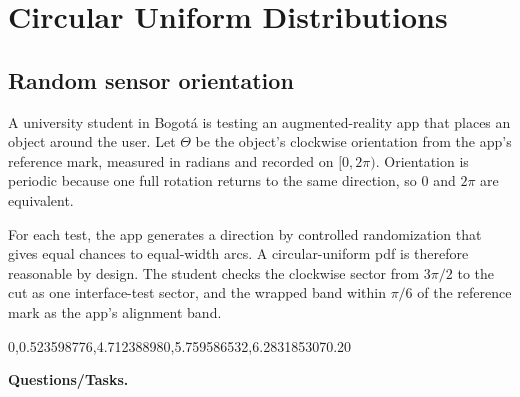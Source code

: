 \section{Circular Uniform Distributions}\label{sec:c3-uniform}
	
	\subsection{Random sensor orientation}\label{sec:c3-uniform-sensor}
	A university student in Bogot\'a is testing an augmented-reality app that places
	an object around the user.  Let $\Theta$ be the object's clockwise orientation
	from the app's reference mark, measured in radians and recorded on $[0,2\pi)$.
	Orientation is periodic because one full rotation returns to the same direction,
	so $0$ and $2\pi$ are equivalent.
	
	For each test, the app generates a direction by controlled randomization that
	gives equal chances to equal-width arcs.  A circular-uniform pdf is therefore
	reasonable by design.  The student checks the clockwise sector from $3\pi/2$
	to the cut as one interface-test sector, and the wrapped band within $\pi/6$
	of the reference mark as the app's alignment band.
	
	\begingroup
	{0,0.523598776,4.712388980,5.759586532,6.283185307}{0.20}
	\endgroup
	
	\textbf{Questions/Tasks.}
	\begin{enumerate}
	\end{enumerate}
	
